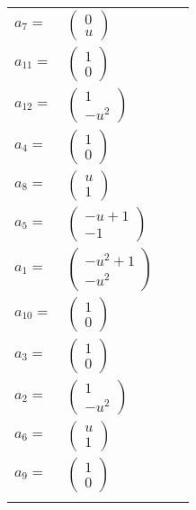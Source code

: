 \documentclass[1p]{elsarticle_modified}
\theoremstyle{definition}
\begin{document}
\begin{tabular}{m{7pt} m{180pt} m{7pt} m{180pt} }
\flushright $a_{7}=$&$\begin{pmatrix}0\\u\end{pmatrix}$ \\
\flushright $a_{11}=$&$\begin{pmatrix}1\\0\end{pmatrix}$ \\
\flushright $a_{12}=$&$\begin{pmatrix}1\\- u^2\end{pmatrix}$ \\
\flushright $a_{4}=$&$\begin{pmatrix}1\\0\end{pmatrix}$ \\
\flushright $a_{8}=$&$\begin{pmatrix}u\\1\end{pmatrix}$ \\
\flushright $a_{5}=$&$\begin{pmatrix}- u+1\\-1\end{pmatrix}$ \\
\flushright $a_{1}=$&$\begin{pmatrix}- u^2+1\\- u^2\end{pmatrix}$ \\
\flushright $a_{10}=$&$\begin{pmatrix}1\\0\end{pmatrix}$ \\
\flushright $a_{3}=$&$\begin{pmatrix}1\\0\end{pmatrix}$ \\
\flushright $a_{2}=$&$\begin{pmatrix}1\\- u^2\end{pmatrix}$ \\
\flushright $a_{6}=$&$\begin{pmatrix}u\\1\end{pmatrix}$ \\
\flushright $a_{9}=$&$\begin{pmatrix}1\\0\end{pmatrix}$\\&\end{tabular}
\end{document}
